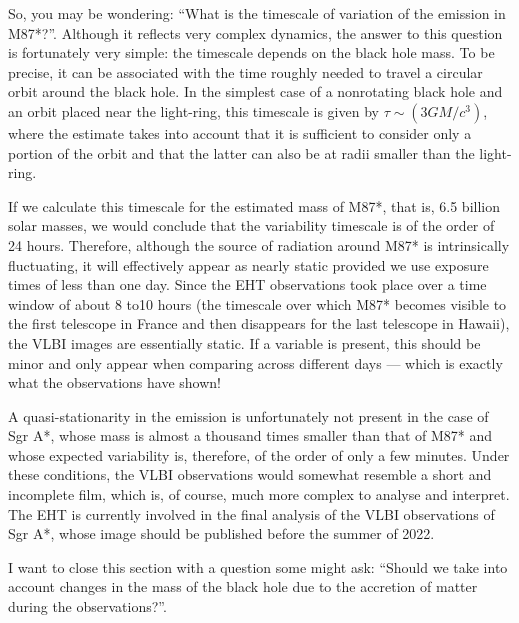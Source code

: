 So, you may be wondering: ``What is the timescale of variation of the emission in
M87*?''. Although it reflects very complex dynamics, the answer to
this question is fortunately very simple: the timescale depends on the black hole mass.
To be precise, it can be associated with the time roughly needed to travel a circular
orbit around the black hole. In the simplest case of a nonrotating
black hole and an orbit placed near the light-ring, this timescale is given by
\(\tau\sim(3GM/c^{3})\), where the estimate takes into account that it is sufficient to
consider only a portion of the orbit and that the latter can also be at radii smaller
than the light-ring.

If we calculate this timescale for the estimated mass of M87*, that
is, 6.5 billion solar masses, we would conclude that the variability
timescale is of the order of 24 hours. Therefore, although the source of radiation
around M87* is intrinsically fluctuating, it will effectively appear as nearly static
provided we use exposure times of less than one day. Since the EHT observations took
place over a time window of about 8 to10 hours (the timescale over which M87* becomes
visible to the first telescope in France and then disappears for the last telescope in
Hawaii), the VLBI images are essentially static. If a variable is present, this should
be minor and only appear when comparing across different days --- which is exactly what
the observations have shown!

A quasi-stationarity in the emission is unfortunately not present in the case of Sgr A*,
whose mass is almost a thousand times smaller than that of M87* and
whose expected variability is, therefore, of the order of only a few
minutes. Under these conditions, the VLBI observations would somewhat resemble a short
and incomplete film, which is, of course, much more complex to analyse and interpret.
The EHT is currently involved in the final analysis of the VLBI observations of Sgr A*,
whose image should be published before the summer of 2022.

I want to close this section with a question some might ask: ``Should we take into
account changes in the mass of the black hole due to the accretion of matter during the
observations?''.

